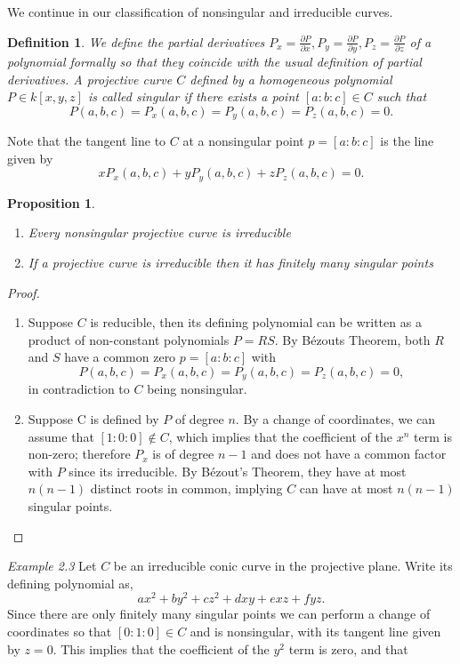 \documentclass{article}
\newtheorem{proposition}{Proposition}
\newtheorem*{definition}{Definition}
\theoremstyle{remark}
\begin{document}
We continue in our classification of nonsingular and irreducible curves.
\begin{definition}
We define the partial derivatives $P_x =\frac{\partial P}{\partial x},P_y =\frac{\partial P}{\partial y},P_z =\frac{\partial P}{\partial z}$ of a polynomial formally so that they coincide with the usual definition of partial derivatives. A projective curve $C$ defined by a homogeneous polynomial $P\in k[x,y,z]$ is called singular if there exists a point $[a:b:c]\in C$ such that 
\[P(a,b,c)=P_x (a,b,c)=P_y (a,b,c)=P_z (a,b,c)=0.\]
\end{definition}
Note that the tangent line to $C$ at a nonsingular point $p=[a:b:c]$ is the line given by
\[xP_x (a,b,c)+yP_y (a,b,c)+zP_z (a,b,c)=0. \]
\begin{proposition} 
\begin{enumerate} 
\item Every nonsingular projective curve is irreducible
\item If a projective curve is irreducible then it has finitely many singular points
\end{enumerate}
\end{proposition}
\begin{proof}
\begin{enumerate}
\item Suppose $C$ is reducible, then its defining polynomial can be written as a product of non-constant polynomials $P=RS$. By Bézouts Theorem, both $R$ and $S$ have a common zero $p=[a:b:c]$ with 
\[P(a,b,c)=P_x (a,b,c)=P_y (a,b,c)=P_z (a,b,c)=0,\]
in contradiction to $C$ being nonsingular.
\item Suppose C is defined by $P$ of degree $n$. By a change of coordinates, we can assume that $[1:0:0]\not\in C$, which implies that the coefficient of the $x^n$ term is non-zero; therefore $P_x$ is of degree $n-1$ and does not have a common factor with $P$ since its irreducible. By Bézout's Theorem, they have at most $n(n-1)$ distinct roots in common, implying $C$ can have at most $n(n-1)$ singular points. 
\end{enumerate}
\end{proof}
\textit{Example 2.3} Let $C$ be an irreducible conic curve in the projective plane. Write its defining polynomial as,
\[ax^2+by^2+cz^2+dxy+exz+fyz.\]
Since there are only finitely many singular points we can perform a change of coordinates so that $[0:1:0]\in C$ and is nonsingular, with its tangent line given by $z=0$. This implies that the coefficient of the $y^2$ term is zero, and that 
\end{document}
